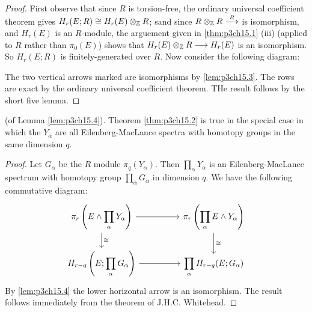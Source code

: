 \documentclass[../main]{subfiles}
\begin{document}
\begin{proof}
First observe that since $R$ is torsion-free, the ordinary universal coefficient theorem gives $H_r(E;R)\cong H_r(E)\otimes_{\mathbb{Z}} R$; sand since $R\otimes_{\mathbb{Z}} R\overset{R}{\longrightarrow}$ is isomorphism, and $H_r(E)$ is an $R$-module, the arguement given in \ref{thm:p3ch15.1} (iii) (applied to $R$ rather than $\pi_0(E)$) shows that $H_r(E)\otimes_{\mathbb{Z}} R\overset{}{\longrightarrow}H_r(E)$ is an isomorphism. So $H_r(E;R)$ is finitely-generated over $R$. Now consider the following diagram:

The two vertical arrows marked are isomorphisms by \ref{lem:p3ch15.3}. The rows are exact by the ordinary universal coefficient theorem. THe result follows by the short five lemma.
\end{proof}
\begin{customcor}{15.5}\label{cor:p3ch15.5} 
(of Lemma \ref{lem:p3ch15.4}). Theorem \ref{thm:p3ch15.2} is true in the special case  in which the $Y_\alpha$ are all Eilenberg-MacLance spectra with homotopy groups in the same dimension $q$.
\end{customcor}
\begin{proof}
Let $G_\alpha$ be the $R$ module $\pi_q(Y_\alpha)$. Then $\displaystyle\prod_\alpha Y_\alpha$ is an Eilenberg-MacLance spectrum with homotopy group $\displaystyle \prod_\alpha G_\alpha $ in dimension $q$. We have the following commutative diagram:
$$\begin{tikzcd}
    \pi_r\left(E\wedge\displaystyle \prod_\alpha Y_\alpha\right) \arrow[rr]\arrow[d,"\cong"] & & \pi_r\left(\displaystyle\prod_\alpha E\wedge Y_\alpha\right)\arrow[d,"\cong"]\\ H_{r-q}\left(E;\displaystyle \prod_\alpha G_\alpha\right) \arrow[rr] & & \displaystyle \prod_\alpha H_{r-q}(E;G_\alpha)
\end{tikzcd}$$
By \ref{lem:p3ch15.4} the lower horizontal arrow is an isomorphism. The result follows immediately from the theorem of J.H.C. Whitehead.
\end{proof}
\end{document}
